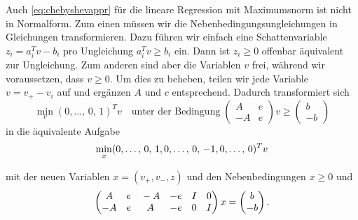 Auch \eqref{eq:chebyshevappr} für die lineare Regression mit
Maximumsnorm ist nicht in Normalform. Zum einen müssen wir die
Nebenbedingungsungleichungen in Gleichungen transformieren. Dazu
führen wir einfach eine Schattenvariable $z_i=a_i^Tv - b_i$ pro
Ungleichung $a_i^Tv\ge b_i$ ein. Dann ist $z_i\ge 0$ offenbar
äquivalent zur Ungleichung. Zum anderen sind aber die Variablen $v$
frei, während wir voraussetzen, dass $v\ge 0$. Um dies zu beheben,
teilen wir jede Variable $v=v_+ - v_i$ auf und ergänzen $A$ und $c$
entsprechend. Dadurch transformiert sich
\begin{equation}
  \min_v (0,\ldots,\,0,\,1)^T v\quad\text{unter der Bedingung}\;
  \begin{pmatrix}
    A & e\\
    -A & e
  \end{pmatrix} v \ge
  \begin{pmatrix}
    b\\
    -b
  \end{pmatrix}
\end{equation}
in die äquivalente Aufgabe
\begin{equation}
  \min_x (\tikzlabel{vpl}0,\ldots,\,0,\,1\tikzlabel{vpr},
  \tikzlabel{vml}0,\ldots,\,0,\,-1\tikzlabel{vmr},
  \tikzlabel{zl}0,\ldots,\,0\tikzlabel{zr})^T v
\end{equation}
mit der neuen Variablen $x=(v_+,v_-,z)$ und den Nebenbedingungen $x\ge 0$
und
\vspace{0.5em}%
\begin{equation*}
  \begin{pmatrix}
    \tikzlabel{vpl}A  & e\tikzlabel{vpr} & 
    \tikzlabel{vml}-A & -e\tikzlabel{vmr} &
    \tikzlabel{zl} I & 0\tikzlabel{zr}\\
    -A & e &  A & -e & 0 & I
  \end{pmatrix}
  x =
  \begin{pmatrix}
    b\\
    -b
  \end{pmatrix}.
\end{equation*}

